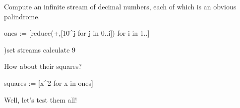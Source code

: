\begin{xtc}
\begin{xtccomment}
Compute an infinite stream of decimal numbers,
each of which is an obvious palindrome.
\end{xtccomment}
\begin{spadsrc}
ones := [reduce(+,[10^j for j in 0..i]) for i in 1..]
\end{spadsrc}
\begin{TeXOutput}
\begin{fricasmath}{7}
%
\end{fricasmath}
\end{TeXOutput}
\end{xtc}
\begin{discard}
\begin{noOutputXtc}
\begin{xtccomment}
\end{xtccomment}
\begin{spadsrc}
)set streams calculate 9
\end{spadsrc}
\end{noOutputXtc}
\end{discard}
\begin{xtc}
\begin{xtccomment}
How about their squares?
\end{xtccomment}
\begin{spadsrc}
squares := [x^2 for x in ones]
\end{spadsrc}
\begin{TeXOutput}
\begin{fricasmath}{8}
%
\end{fricasmath}
\end{TeXOutput}
\end{xtc}
\begin{xtc}
\begin{xtccomment}
Well, let's test them all!
\end{xtccomment}
\begin{spadsrc}
\end{spadsrc}
\begin{TeXOutput}
\begin{fricasmath}{9}
%
\end{fricasmath}
\end{TeXOutput}
\end{xtc}
